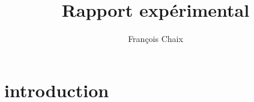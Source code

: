 \documentclass[11pt, a4paper]{scrreprt}
\title{Rapport expérimental}
\author{François Chaix}
\begin{document}
\tableofcontents
%
\chapter{introduction}

\printbibliography
\end{document}

